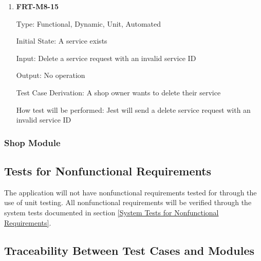 \documentclass[12pt, titlepage]{article}
\begin{document}
\begin{enumerate}
	\item \textbf{FRT-M8-15}

	      Type: Functional, Dynamic, Unit, Automated

	      Initial State: A service exists

	      Input: Delete a service request with an invalid service ID

	      Output: No operation

	      Test Case Derivation: A shop owner wants to delete their service

	      How test will be performed: Jest will send a delete service request with an invalid service ID

\end{enumerate}

\subsubsection{Shop Module}

\subsection{Tests for Nonfunctional Requirements}

The application will not have nonfunctional requirements tested for through the use of unit
testing. All nonfunctional requirements will be verified through the system tests documented in
section \ref{System Tests for Nonfunctional Requirements}.

\newpage

\subsection{Traceability Between Test Cases and Modules}
\end{document}

